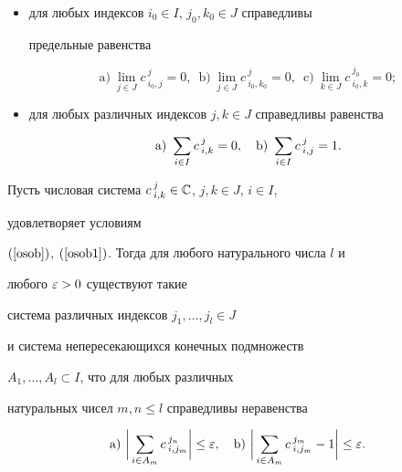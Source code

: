 \begin{itemize}


\item[1)] для любых индексов $i_0 \in I$, $j_0,k_0 \in J$ справедливы


предельные равенства


\begin{equation}


\label{osob}


\mathrm a) \ \lim_{j \in J} c\,^j_{i_0,j}= 0,\ \;


\mathrm b) \ \lim_{j \in J} c\,^j_{i_0,k_0} =0,\ \;


\mathrm c) \ \lim_{k \in J} c\,^{j_0}_{i_0,k}=0;


\end{equation}


\item[2)] для любых различных индексов $j,k \in J$ справедливы равенства


\begin{equation}


\label{osob1}


\mathrm a)\ \sumi c\,^j_{i,k}=0,\quad \mathrm b) \ \sumi c\,^j_{i,j}=1.


\end{equation}


\end{itemize}





\begin{thm}


\label{T1}


Пусть числовая система $c\,^j_{i,k} \in \Bbb C$, $j,k \in J$, $i \in I$,


удовлетворяет условиям


$(\ref{osob})$, $(\ref{osob1})$. Тогда для любого натурального числа $l$ и


любого $\varepsilon >0$ существуют такие


система различных индексов $j_1,\dotsc,j_l \in J$


и система непересекающихся конечных подмножеств


$A_1,\dotsc,A_l \subset I$, что для любых различных


натуральных чисел $m,n \le l$ справедливы неравенства


\begin{equation}


\label{oss}


\mathrm a) \ \bigg | \sum_{i \in A_m} c\,^{j_n}_{i,j_m} \bigg | \le \ep, \quad


\mathrm b) \ \bigg | \sum_{i \in A_m} c\,^{j_m}_{i,j_m}  -1\bigg | \le \ep .


\end{equation}


\end{thm}





